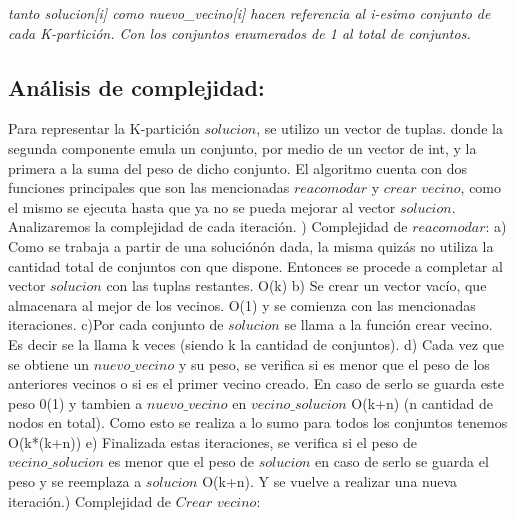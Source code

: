 \documentclass[a4paper]{article}
\begin{document}
 \textit {tanto solucion[i] como nuevo\_vecino[i] hacen referencia al i-esimo conjunto de cada K-partici\'on. Con los conjuntos enumerados de 1 al total de conjuntos.}
 
\subsection{An\'alisis de complejidad:}
 
Para representar la K-partici\'on $solucion$, se utilizo un vector de tuplas. donde la segunda componente emula un conjunto, por medio de un vector de int, y la primera a la suma del peso de dicho conjunto. 
El algoritmo cuenta con dos funciones principales que son las mencionadas $reacomodar$ y $crear$ $vecino$, como el mismo se ejecuta hasta que ya no se pueda mejorar al vector $solucion$. Analizaremos la complejidad de cada iteraci\'on.  \newline {}) Complejidad de $reacomodar$:\newline
a) Como se trabaja a partir de una soluci\'on\'on dada, la misma quiz\'as no utiliza la cantidad total de conjuntos con que dispone. Entonces se procede a completar al vector $solucion$ con las tuplas restantes. O(k)\newline
b) Se crear un vector vac\'io, que almacenara al mejor de los vecinos. O(1) y se comienza con las mencionadas iteraciones. \newline
c)Por cada conjunto de $solucion$ se llama a la funci\'on crear vecino. Es decir se la llama k veces (siendo k la cantidad de conjuntos). \newline
d) Cada vez que se obtiene un $nuevo\_vecino$ y su peso, se verifica si es menor que el peso de los anteriores vecinos o si es el primer vecino creado. En caso de serlo se guarda este peso 0(1) y tambien a $nuevo\_vecino$ en $vecino\_solucion$ O(k+n) (n cantidad de nodos en total). Como esto se realiza a lo sumo para todos los conjuntos tenemos O(k*(k+n))\newline
e) Finalizada estas iteraciones, se verifica si el peso de $vecino\_solucion$ es menor que el peso de $solucion$ en caso de serlo se guarda el peso y se reemplaza a $solucion$ O(k+n). Y se vuelve a realizar una nueva iteraci\'on.\newline {}) Complejidad de $Crear$ $vecino$: \newline
\end{document}
